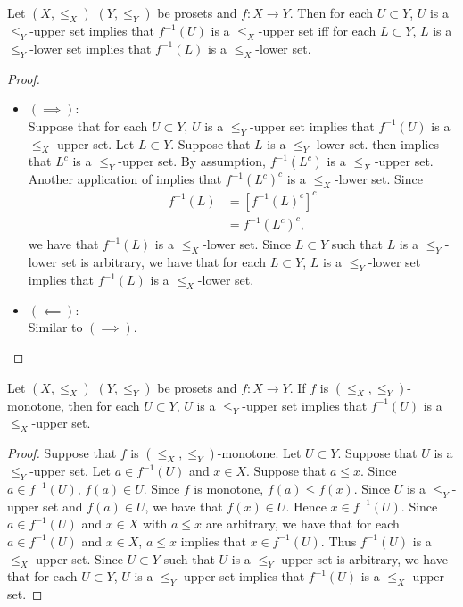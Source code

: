 \documentclass{book}
\begin{document}
	\begin{ex} 
		Let $(X, \leq_X)$ $(Y, \leq_Y)$ be prosets and $f:X \rightarrow Y$. Then for each $U \subset Y$, $U$ is a $\leq_Y$-upper set implies that $f^{-1}(U)$ is a $\leq_X$-upper set iff for each $L \subset Y$, $L$ is a $\leq_Y$-lower set implies that $f^{-1}(L)$ is a $\leq_X$-lower set.
	\end{ex}
	
	\begin{proof}\
		\begin{itemize}
			\item $(\implies)$: \\
			Suppose that for each $U \subset Y$, $U$ is a $\leq_Y$-upper set implies that $f^{-1}(U)$ is a $\leq_X$-upper set. Let $L \subset Y$. Suppose that $L$ is a $\leq_Y$-lower set.  then implies that $L^c$ is a $\leq_Y$-upper set. By assumption, $f^{-1}(L^c)$ is a $\leq_X$-upper set. Another application of  implies that $f^{-1}(L^c)^c$ is a $\leq_X$-lower set. Since
			\begin{align*}
				f^{-1}(L)
				& = [f^{-1}(L)^c]^c \\
				& = f^{-1}(L^c)^c,
			\end{align*}
			we have that $f^{-1}(L)$ is a $\leq_X$-lower set. Since $L \subset Y$ such that $L$ is a $\leq_Y$-lower set is arbitrary, we have that for each $L \subset Y$, $L$ is a $\leq_Y$-lower set implies that $f^{-1}(L)$ is a $\leq_X$-lower set. 
			\item $(\impliedby)$: \\
			Similar to $(\implies)$.
		\end{itemize}
	\end{proof}
	
	\begin{ex} 
		Let $(X, \leq_X)$ $(Y, \leq_Y)$ be prosets and $f:X \rightarrow Y$. If $f$ is $(\leq_X, \leq_Y)$-monotone, then for each $U \subset Y$, $U$ is a $\leq_Y$-upper set implies that $f^{-1}(U)$ is a $\leq_X$-upper set.
	\end{ex}
	
	\begin{proof}
		Suppose that $f$ is $(\leq_X, \leq_Y)$-monotone. Let $U \subset Y$. Suppose that $U$ is a $\leq_Y$-upper set. Let $a \in f^{-1}(U)$ and $x \in X$. Suppose that $a \leq x$. Since $a \in f^{-1}(U)$, $f(a) \in U$. Since $f$ is monotone, $f(a) \leq f(x)$. Since $U$ is a $\leq_Y$-upper set and $f(a) \in U$, we have that $f(x) \in U$. Hence $x \in f^{-1}(U)$. Since $a \in f^{-1}(U)$ and $x \in X$ with $a \leq x$ are arbitrary, we have that for each $a \in f^{-1}(U)$ and $x \in X$, $a \leq x$ implies that $x \in f^{-1}(U)$. Thus $f^{-1}(U)$ is a $\leq_X$-upper set. Since $U \subset Y$ such that $U$ is a $\leq_Y$-upper set is arbitrary, we have that for each $U \subset Y$, $U$ is a $\leq_Y$-upper set implies that $f^{-1}(U)$ is a $\leq_X$-upper set.
	\end{proof}
	
\end{document}
